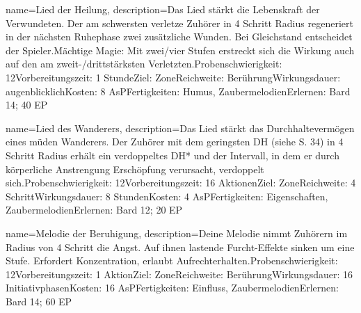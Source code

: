 {
    name={Lied der Heilung},
    description={Das Lied stärkt die Lebenskraft der Verwundeten. Der am schwersten verletze Zuhörer in 4 Schritt Radius regeneriert in der nächsten Ruhephase zwei zusätzliche Wunden. Bei Gleichstand entscheidet der Spieler.\newline Mächtige Magie: Mit zwei/vier Stufen erstreckt sich die Wirkung auch auf den am zweit-/drittstärksten Verletzten.\newline Probenschwierigkeit: 12\newline Vorbereitungszeit: 1 Stunde\newline Ziel: Zone\newline Reichweite: Berührung\newline Wirkungsdauer: augenblicklich\newline Kosten: 8 AsP\newline Fertigkeiten: Humus, Zaubermelodien\newline Erlernen: Bard 14; 40 EP}
}


{
    name={Lied des Wanderers},
    description={Das Lied stärkt das Durchhaltevermögen eines müden Wanderers. Der Zuhörer mit dem geringsten DH (siehe S. 34) in 4 Schritt Radius erhält ein verdoppeltes DH* und der Intervall, in dem er durch körperliche Anstrengung Erschöpfung verursacht, verdoppelt sich.\newline Probenschwierigkeit: 12\newline Vorbereitungszeit: 16 Aktionen\newline Ziel: Zone\newline Reichweite: 4 Schritt\newline Wirkungsdauer: 8 Stunden\newline Kosten: 4 AsP\newline Fertigkeiten: Eigenschaften, Zaubermelodien\newline Erlernen: Bard 12; 20 EP}
}


{
    name={Melodie der Beruhigung},
    description={Deine Melodie nimmt Zuhörern im Radius von 4 Schritt die Angst. Auf ihnen lastende Furcht-Effekte sinken um eine Stufe. Erfordert Konzentration, erlaubt Aufrechterhalten.\newline Probenschwierigkeit: 12\newline Vorbereitungszeit: 1 Aktion\newline Ziel: Zone\newline Reichweite: Berührung\newline Wirkungsdauer: 16 Initiativphasen\newline Kosten: 16 AsP\newline Fertigkeiten: Einfluss, Zaubermelodien\newline Erlernen: Bard 14; 60 EP}
}


